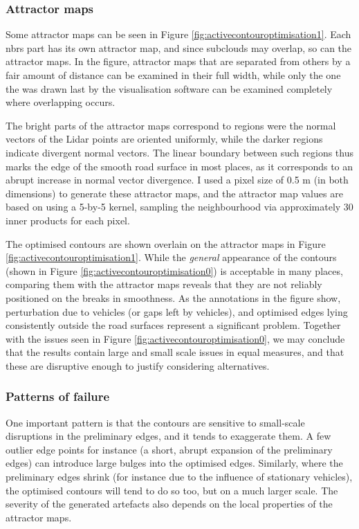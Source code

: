 \subsubsection{Attractor maps}

Some attractor maps can be seen in Figure \ref{fig:activecontouroptimisation1}. Each \ac{nbrs} part has its own attractor map, and since subclouds may overlap, so can the attractor maps. In the figure, attractor maps that are separated from others by a fair amount of distance can be examined in their full width, while only the one the was drawn last by the visualisation software can be examined completely where overlapping occurs.

The bright parts of the attractor maps correspond to regions were the normal vectors of the Lidar points are oriented uniformly, while the darker regions indicate divergent normal vectors. The linear boundary between such regions thus marks the edge of the smooth road surface in most places, as it corresponds to an abrupt increase in normal vector divergence. I used a pixel size of 0.5 m (in both dimensions) to generate these attractor maps, and the attractor map values are based on using a 5-by-5 kernel, sampling the neighbourhood via approximately 30 inner products for each pixel.

The optimised contours are shown overlain on the attractor maps in Figure \ref{fig:activecontouroptimisation1}. While the \textit{general} appearance of the contours (shown in Figure \ref{fig:activecontouroptimisation0}) is acceptable in many places, comparing them with the attractor maps reveals that they are not reliably positioned on the breaks in smoothness. As the annotations in the figure show, perturbation due to vehicles (or gaps left by vehicles), and optimised edges lying consistently outside the road surfaces represent a significant problem. Together with the issues seen in Figure \ref{fig:activecontouroptimisation0}, we may conclude that the results contain large and small scale issues in equal measures, and that these are disruptive enough to justify considering alternatives.

\subsubsection{Patterns of failure}

One important pattern is that the contours are sensitive to small-scale disruptions in the preliminary edges, and it tends to exaggerate them. A few outlier edge points for instance (a short, abrupt expansion of the preliminary edges) can introduce large bulges into the optimised edges. Similarly, where the preliminary edges shrink (for instance due to the influence of stationary vehicles), the optimised contours will tend to do so too, but on a much larger scale. The severity of the generated artefacts also depends on the local properties of the attractor maps.

